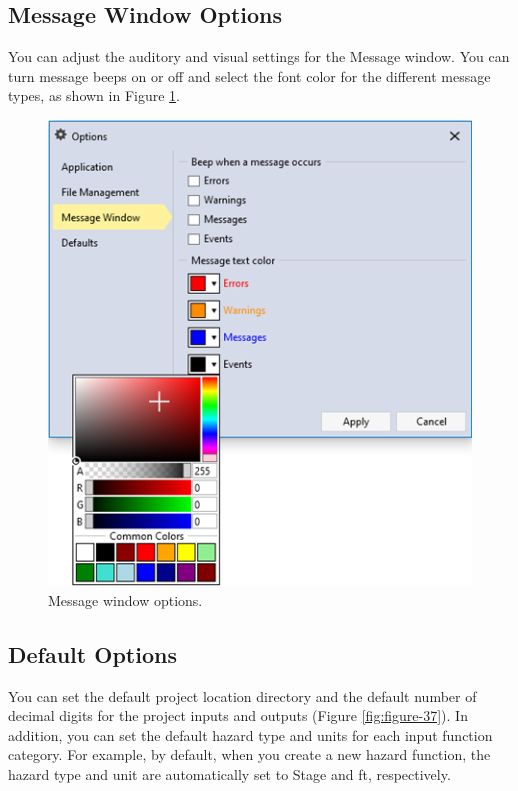 \documentclass[
]{book}
\begin{document}
\hypertarget{message-window-options}{%
\subsection{Message Window Options}\label{message-window-options}}

You can adjust the auditory and visual settings for the Message window. You can turn message beeps on or off and select the font color for the different message types, as shown in Figure \ref{fig:figure-36}.

\begin{figure}

{\centering \includegraphics{images/figure36} 

}

\caption{Message window options.}\label{fig:figure-36}
\end{figure}

\hypertarget{default-options}{%
\subsection{Default Options}\label{default-options}}

You can set the default project location directory and the default number of decimal digits for the project inputs and outputs (Figure \ref{fig:figure-37}). In addition, you can set the default hazard type and units for each input function category. For example, by default, when you create a new hazard function, the hazard type and unit are automatically set to Stage and ft, respectively.
\end{document}
